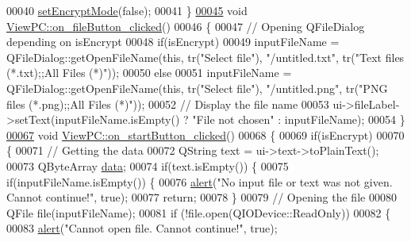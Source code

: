 \begin{DoxyCode}
00040     \mbox{\hyperlink{class_view_p_c_a5b48951efefdc0e3039c9a4bf185320b}{setEncryptMode}}(\textcolor{keyword}{false});
00041 \}
\mbox{\hyperlink{class_view_p_c_a3b9b7a7be9702d8b160f257f1c74a776}{00045}} \textcolor{keywordtype}{void} \mbox{\hyperlink{class_view_p_c_a3b9b7a7be9702d8b160f257f1c74a776}{ViewPC::on\_fileButton\_clicked}}()
00046 \{
00047     \textcolor{comment}{// Opening QFileDialog depending on isEncrypt}
00048     \textcolor{keywordflow}{if}(isEncrypt)
00049         inputFileName = QFileDialog::getOpenFileName(\textcolor{keyword}{this}, tr(\textcolor{stringliteral}{"Select file"}), \textcolor{stringliteral}{"/untitled.txt"}, tr(\textcolor{stringliteral}{"Text
       files (*.txt);;All Files (*)"}));
00050     \textcolor{keywordflow}{else}
00051         inputFileName = QFileDialog::getOpenFileName(\textcolor{keyword}{this}, tr(\textcolor{stringliteral}{"Select file"}), \textcolor{stringliteral}{"/untitled.png"}, tr(\textcolor{stringliteral}{"PNG
       files (*.png);;All Files (*)"}));
00052     \textcolor{comment}{// Display the file name}
00053     ui->fileLabel->setText(inputFileName.isEmpty() ? \textcolor{stringliteral}{"File not chosen"} : inputFileName);
00054 \}
\mbox{\hyperlink{class_view_p_c_a456d75b7c5d3a089302a576e7359f1f4}{00067}} \textcolor{keywordtype}{void} \mbox{\hyperlink{class_view_p_c_a456d75b7c5d3a089302a576e7359f1f4}{ViewPC::on\_startButton\_clicked}}()
00068 \{
00069     \textcolor{keywordflow}{if}(isEncrypt)
00070     \{
00071         \textcolor{comment}{// Getting the data}
00072         QString text = ui->text->toPlainText();
00073         QByteArray \mbox{\hyperlink{namespace_errors_dict_setup_af570460846fb9f0c91abd308a095dcdc}{data}};
00074         \textcolor{keywordflow}{if}(text.isEmpty()) \{
00075             \textcolor{keywordflow}{if}(inputFileName.isEmpty()) \{
00076                 \mbox{\hyperlink{class_view_p_c_a7c467169467789561078abc9d4fe57bd}{alert}}(\textcolor{stringliteral}{"No input file or text was not given. Cannot continue!"}, \textcolor{keyword}{true});
00077                 \textcolor{keywordflow}{return};
00078             \}
00079             \textcolor{comment}{// Opening the file}
00080             QFile file(inputFileName);
00081             \textcolor{keywordflow}{if} (!file.open(QIODevice::ReadOnly))
00082             \{
00083                 \mbox{\hyperlink{class_view_p_c_a7c467169467789561078abc9d4fe57bd}{alert}}(\textcolor{stringliteral}{"Cannot open file. Cannot continue!"}, \textcolor{keyword}{true});

\end{DoxyCode}

